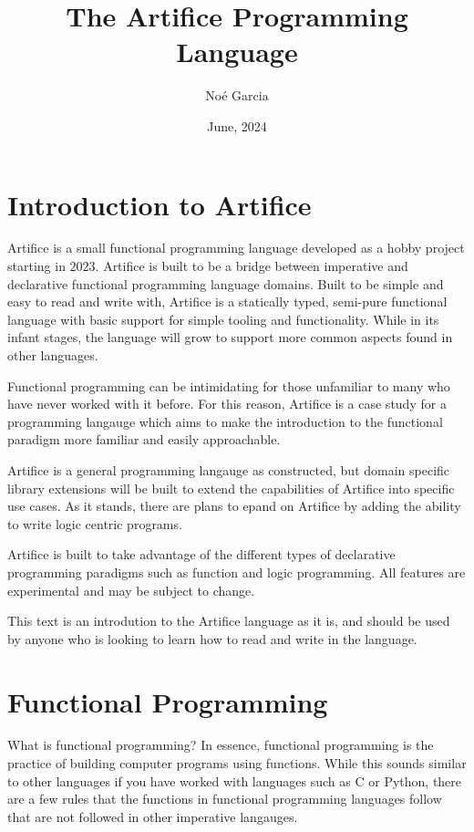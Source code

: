 \documentclass{article}
\title{
	\vspace{2in}
	\textmd{\textbf{The Artifice Programming Language}}
	\vspace{3in}
}
\author{No\'e Garcia}
\date{June, 2024}
\begin{document}
\maketitle
\newpage

\section{Introduction to Artifice}

Artifice is a small functional programming language developed as a hobby project starting in
$2023$. Artifice is built to be a bridge between imperative and  declarative functional programming
language domains. Built to be simple and easy to read and write with, Artifice is a statically typed,
semi-pure functional language with basic support for simple tooling and functionality. While in
its infant stages, the language will grow to support more common aspects found in other
languages.

Functional programming can be intimidating for those unfamiliar to many who have never worked
with it before. For this reason, Artifice is a case study for a programming langauge which aims to
make the introduction to the functional paradigm more familiar and easily approachable.

Artifice is a general programming langauge as constructed, but domain specific library extensions
will be built to extend the capabilities of Artifice into specific use cases. As it stands, there are
plans to epand on Artifice by adding the ability to write logic centric programs.

Artifice is built to take advantage of the different types of declarative programming paradigms such as
function and logic programming. All features are experimental and may be subject to change.

This text is an introdution to the Artifice language as it is, and should be used by anyone who is looking
to learn how to read and write in the language.


\section{Functional Programming}

What is functional programming? In essence, functional programming is the practice of building computer
programs using functions. While this sounds similar to other languages if you have worked with languages
such as C or Python, there are a few rules that the functions in functional programming languages follow
that are not followed in other imperative langauges.
\end{document}
